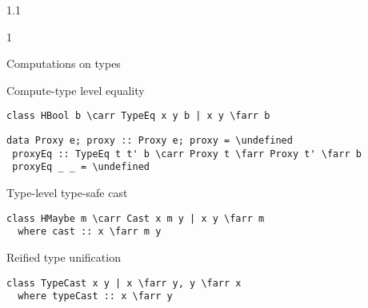 \documentclass{slides}
\newenvironment{myslide}{\begin{slide}\color{Blue}\begin{boxedminipage}{1.1\hsize}\begin{boxedminipage}{1\hsize}\color{Black}
\vspace{-170\in}
}{%
\smallskip
\end{boxedminipage}
\end{boxedminipage}
\end{slide}}
\newenvironment{myslide}{\begin{slide}
}{%
\end{slide}}
\newenvironment{myslide}{\begin{slide}\color{White}\begin{boxedminipage}{1.1\hsize}\color{Black}
\vspace{-170\in}
}{%
\smallskip
\end{boxedminipage}
\end{slide}}
\newcommand{\header}[1]{{\large \color{Red} #1}}
\newcommand{\blau}[1]{{\vspace{-50\in}\normalsize \color{Blue} #1}}
\newcommand{\undefined}{\ensuremath{\bot}}
\newcommand{\farr}{\ensuremath{\to}}
\newcommand{\carr}{\ensuremath{\Rightarrow}}
\begin{document}
\begin{myslide}

\header{Computations on types}

\vspace{-66\in}

\blau{Compute-type level equality}

\smallskip

\begin{Verbatim}[fontfamily=courier,fontsize=\small,commandchars=\\\{\}]
 class HBool b \carr TypeEq x y b | x y \farr b
\end{Verbatim}

\smallskip

\begin{Verbatim}[fontfamily=courier,fontsize=\tiny,commandchars=\\\{\}]
 data Proxy e; proxy :: Proxy e; proxy = \undefined
 proxyEq :: TypeEq t t' b \carr Proxy t \farr Proxy t' \farr b
 proxyEq _ _ = \undefined
\end{Verbatim}

\vspace{-77\in}

\blau{Type-level type-safe cast}

\smallskip

\begin{Verbatim}[fontfamily=courier,fontsize=\small,commandchars=\\\{\}]
 class HMaybe m \carr Cast x m y | x y \farr m
  where cast :: x \farr m y
\end{Verbatim}

\vspace{-77\in}

\blau{Reified type unification}

\smallskip

\begin{Verbatim}[fontfamily=courier,fontsize=\small,commandchars=\\\{\}]
 class TypeCast x y | x \farr y, y \farr x
  where typeCast :: x \farr y
\end{Verbatim}

\end{myslide}



\end{document}
